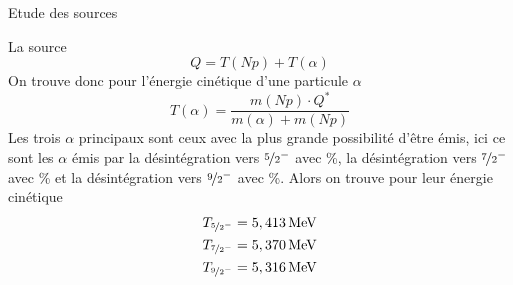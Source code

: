 \documentclass[a4paper,11pt,liststotocnumbered,bibtotocnumbered]{scrartcl}
\begin{document}
\begin{section}{Etude des sources}
\begin{subsection}{La source }
   \begin{equation*}
    Q=T(Np)+T(\alpha)
   \end{equation*}
   On trouve donc pour l'énergie cinétique d'une particule $\alpha$    
   \begin{equation*}
    T(\alpha)=\frac{m(Np)\cdot Q^{\ast}}{m(\alpha)+m(Np)}
   \end{equation*}
   Les trois $\alpha$ principaux sont ceux avec la plus grande possibilité d'être émis, ici ce sont les $\alpha$ émis par la désintégration vers  $\nicefrac{5}{2}^-$ avec \unit[84,85]{\%}, la désintégration vers  $\nicefrac{7}{2}^-$ avec \unit[13,23]{\%} et la désintégration vers  $\nicefrac{9}{2}^-$ avec \unit[1,66]{\%}. Alors on trouve pour leur énergie cinétique
   \begin{eqnarray*}
    T_{\nicefrac{5}{2}^-}=\unit[5,413]{MeV}\\
    T_{\nicefrac{7}{2}^-}=\unit[5,370]{MeV}\\
    T_{\nicefrac{9}{2}^-}=\unit[5,316]{MeV}
   \end{eqnarray*}
  \end{subsection}
 

\end{section}
\end{document}
